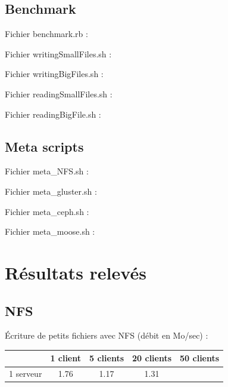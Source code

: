 \documentclass[12pt]{report}
\begin{document}
			\section{Benchmark}
				Fichier benchmark.rb :
				

				Fichier writingSmallFiles.sh :
				

				Fichier writingBigFiles.sh :
				

				Fichier readingSmallFiles.sh :
				

				Fichier readingBigFile.sh :
				
			\section{Meta scripts}
				Fichier meta\_NFS.sh :
				

				Fichier meta\_gluster.sh :
				

				Fichier meta\_ceph.sh :
				

				Fichier meta\_moose.sh :
				

		\chapter{Résultats relevés}

			\section{NFS}

			Écriture de petits fichiers avec NFS (débit en Mo/sec) :

			\begin{tabular}{|l|c|c|c|c|}
				\hline
				& 1 client & 5 clients & 20 clients & 50 clients \\
				\hline
				1 serveur & 1.76 & 1.17 & 1.31 & \\
				\hline
			\end{tabular}\\\\
\end{document}
